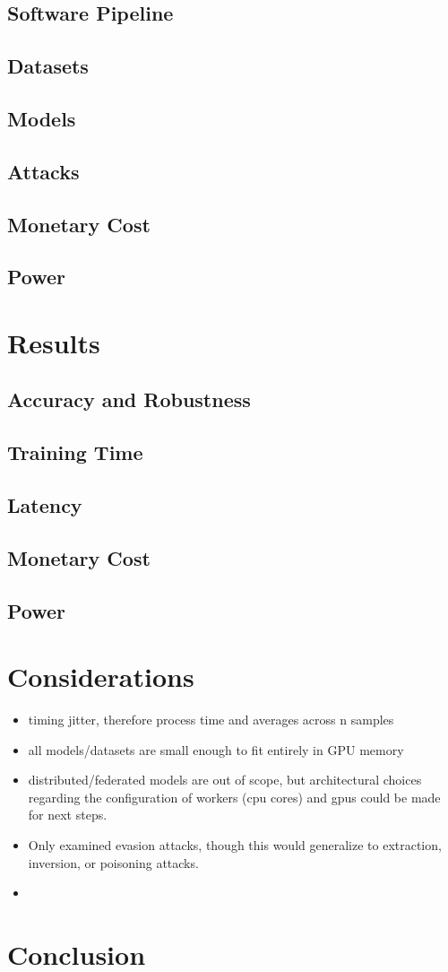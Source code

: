 \documentclass[conference]{IEEEtran}
\begin{document}
\subsection{Software Pipeline}
\subsection{Datasets}
\subsection{Models}
\subsection{Attacks}
\subsection{Monetary Cost}
\subsection{Power}

\section{Results}
\subsection{Accuracy and Robustness}
\subsection{Training Time}
\subsection{Latency}
\subsection{Monetary Cost}
\subsection{Power}
\section{Considerations}
\begin{itemize}
 \item timing jitter, therefore process time and averages across n samples
 \item all models/datasets are small enough to fit entirely in GPU memory
 \item distributed/federated models are out of scope, but architectural choices regarding the configuration of workers (cpu cores) and gpus could be made for next steps.
 \item Only examined evasion attacks, though this would generalize to extraction, inversion, or poisoning attacks.
 \item 
\end{itemize}
\section{Conclusion}

\newpage


\vspace{12pt}
\end{document}
